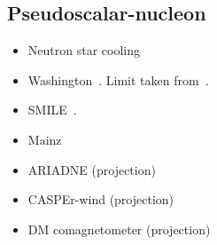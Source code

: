 \documentclass[9pt,twocolumn]{extarticle}
\begin{document}
\begin{mdframed}
\subsection*{Pseudoscalar-nucleon}\vspace{-0.5em}
\begin{itemize}\setlength\itemsep{-0.5em}
	\item Neutron star cooling~\cite{Beznogov:2018fda}
    \item Washington~\cite{Venema:1992zz}. Limit taken from~\cite{Safronova:2017xyt}.
    \item SMILE~\cite{Lee:2018vaq}.
    \item Mainz~\cite{Tullney:2013wqa}
    \item ARIADNE (projection)~\cite{Arvanitaki:2014dfa}
    \item CASPEr-wind (projection)~\cite{JacksonKimball:2017elr}
    \item DM comagnetometer (projection)~\cite{Bloch:2019lcy}
\end{itemize}
\end{mdframed}

\newpage
\end{document}
